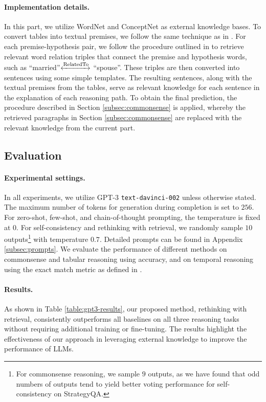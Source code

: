 \paragraph{Implementation details.} In this part, we utilize WordNet \cite{miller1995wordnet} and ConceptNet \cite{speer2017conceptnet} as external knowledge bases. To convert tables into textual premises, we follow the same technique as in \citet{varun2022trans}. For each premise-hypothesis pair, we follow the procedure outlined in \citet{varun2022trans} to retrieve relevant word relation triples that connect the premise and hypothesis words, such as ``married''$ \xleftrightarrow{\text{RelatedTo}}$ ``spouse''. These triples are then converted into sentences using some simple templates. The resulting sentences, along with the textual premises from the tables, serve as relevant knowledge for each sentence in the explanation of each reasoning path. To obtain the final prediction, the procedure described in Section \ref{subsec:commonsense} is applied, whereby the retrieved paragraphs in Section \ref{subsec:commonsense} are replaced with the relevant knowledge from the current part.

\subsection{Evaluation}
\label{subsec:evaluation}

\paragraph{Experimental settings.} In all experiments, we utilize GPT-3 \texttt{text-davinci-002} unless otherwise stated. The maximum number of tokens for generation during completion is set to $256$. For zero-shot, few-shot, and chain-of-thought prompting, the temperature is fixed at $0$. For self-consistency and rethinking with retrieval, we randomly sample $10$ outputs\footnote{For commonsense reasoning, we sample $9$ outputs, as we have found that odd numbers of outputs tend to yield better voting performance for self-consistency on StrategyQA.} with temperature $0.7$. Detailed prompts can be found in Appendix \ref{subsec:prompts}. We evaluate the performance of different methods on commonsense and tabular reasoning using accuracy, and on temporal reasoning using the exact match metric as defined in \citet{rajpurkar2016squad}.

\paragraph{Results.} As shown in Table \ref{table:gpt3-results}, our proposed method, rethinking with retrieval, consistently outperforms all baselines on all three reasoning tasks without requiring additional training or fine-tuning. The results highlight the effectiveness of our approach in leveraging external knowledge to improve the performance of LLMs. 

